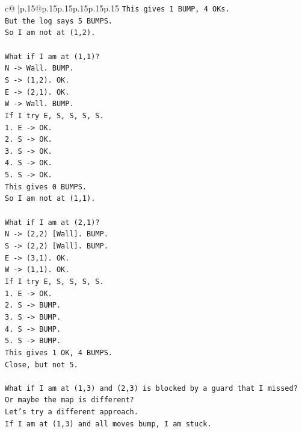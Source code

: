 \documentclass{article}
\begin{document}
{\begin{supertabular}{c@{$\;$}|p{.15\linewidth}@{}p{.15\linewidth}p{.15\linewidth}p{.15\linewidth}p{.15\linewidth}p{.15\linewidth}}
{{{\texttt{This gives 1 BUMP, 4 OKs.} \\
\texttt{But the log says 5 BUMPS.} \\
\texttt{So I am not at (1,2).} \\
\\ 
\texttt{What if I am at (1,1)?} \\
\texttt{N {-}> Wall. BUMP.} \\
\texttt{S {-}> (1,2). OK.} \\
\texttt{E {-}> (2,1). OK.} \\
\texttt{W {-}> Wall. BUMP.} \\
\texttt{If I try E, S, S, S, S.} \\
\texttt{1. E {-}> OK.} \\
\texttt{2. S {-}> OK.} \\
\texttt{3. S {-}> OK.} \\
\texttt{4. S {-}> OK.} \\
\texttt{5. S {-}> OK.} \\
\texttt{This gives 0 BUMPS.} \\
\texttt{So I am not at (1,1).} \\
\\ 
\texttt{What if I am at (2,1)?} \\
\texttt{N {-}> (2,2) {[}Wall{]}. BUMP.} \\
\texttt{S {-}> (2,2) {[}Wall{]}. BUMP.} \\
\texttt{E {-}> (3,1). OK.} \\
\texttt{W {-}> (1,1). OK.} \\
\texttt{If I try E, S, S, S, S.} \\
\texttt{1. E {-}> OK.} \\
\texttt{2. S {-}> BUMP.} \\
\texttt{3. S {-}> BUMP.} \\
\texttt{4. S {-}> BUMP.} \\
\texttt{5. S {-}> BUMP.} \\
\texttt{This gives 1 OK, 4 BUMPS.} \\
\texttt{Close, but not 5.} \\
\\ 
\texttt{What if I am at (1,3) and (2,3) is blocked by a guard that I missed?} \\
\texttt{Or maybe the map is different?} \\
\texttt{Let's try a different approach.} \\
\texttt{If I am at (1,3) and all moves bump, I am stuck.} \\
}}}
\end{supertabular}}
\end{document}
